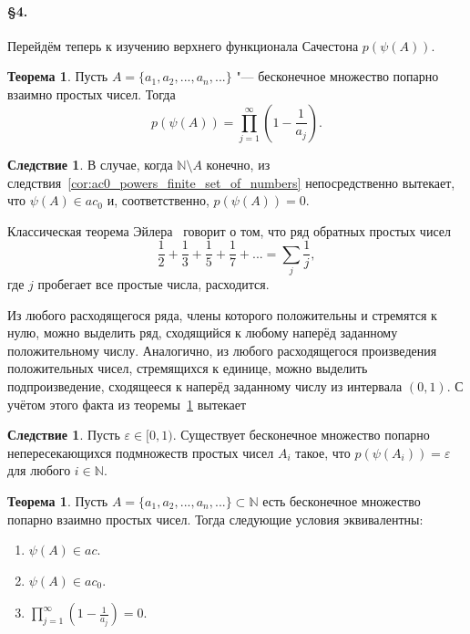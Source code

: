 \documentclass[a4paper,openbib]{article}
\theoremstyle{definition}
\newtheorem{theorem}[lemma]{Теорема}
\newtheorem{corollary}[lemma]{Следствие}
\begin{document}
\paragraph{\S 4.}


Перейдём теперь к изучению верхнего функционала Сачестона $p(\psi(A))$.

\begin{theorem}
	\label{thm:ac0_primes_p_psi_A_prod}
	Пусть $A = \{a_1, a_2, ..., a_n,...\}$ "--- бесконечное множество попарно взаимно простых чисел.
	Тогда
	\begin{equation}
		p(\psi(A)) = \prod_{j=1}^\infty \left(1-\frac{1}{a_j}\right)
		.
	\end{equation}
\end{theorem}


\begin{corollary}
	В случае, когда $\mathbb{N}\setminus A$ конечно, из следствия~\ref{cor:ac0_powers_finite_set_of_numbers} непосредственно вытекает, что $\psi(A)\in ac_0$
	и, соответственно, $p(\psi(A))=0$.
\end{corollary}



Классическая теорема Эйлера~\cite{euler1737variae} говорит о том, что
ряд обратных простых чисел
\begin{equation}
	\frac{1}{2} + \frac{1}{3} + \frac{1}{5} + \frac{1}{7} + ...
	=
	\sum_j \frac{1}{j},
\end{equation}
где $j$ пробегает все простые числа, расходится.

Из любого расходящегося ряда, члены которого положительны и стремятся к нулю,
можно выделить ряд, сходящийся к любому наперёд заданному положительному числу.
Аналогично, из любого расходящегося произведения положительных чисел, стремящихся к единице, можно выделить
подпроизведение, сходящееся к наперёд заданному числу из интервала $(0,1)$.
С учётом этого факта
из теоремы~\ref{thm:ac0_primes_p_psi_A_prod} вытекает
\begin{corollary}
	Пусть $\varepsilon \in {[} 0, 1)$.
	Существует бесконечное множество попарно непересекающихся подмножеств простых чисел
	$A_i$ такое, что $p(\psi(A_i))=\varepsilon$ для любого $i\in\mathbb{N}$.
\end{corollary}

\begin{theorem}
	Пусть $A=\{a_1, a_2, ..., a_n, ...\}\subset\mathbb{N}$ есть бесконечное множество попарно взаимно простых чисел.
	Тогда следующие условия эквивалентны:
	\begin{enumerate}[label=(\roman*)]
		\item
			$\psi(A)\in ac$.
		\item
			$\psi(A)\in ac_0$.
		\item
			$\prod_{j=1}^\infty \left(1-\frac{1}{a_j}\right) = 0$.
	\end{enumerate}
\end{theorem}
\end{document}
